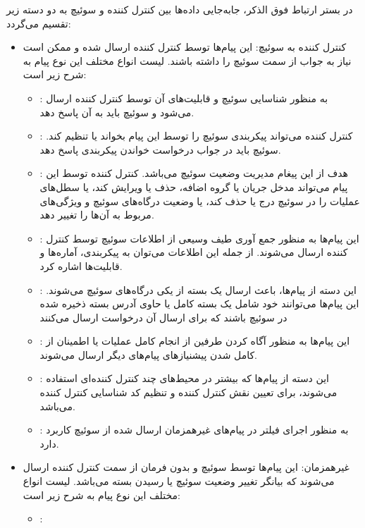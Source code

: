 در بستر ارتباط فوق الذکر، جا‌به‌جایی داده‌ها بین کنترل کننده و سوئیچ به دو دسته زیر تقسیم می‌گردد:
\begin{itemize}
	\item
	کنترل کننده به سوئیچ: این پیام‌ها توسط کنترل کننده ارسال شده و ممکن است نیاز به جواب از سمت سوئیچ را داشته باشند. لیست انواع مختلف این نوع پیام به شرح زیر است:
	\begin{itemize}
		\item {}:
		به منظور شناسایی سوئیچ و قابلیت‌های آن توسط کنترل‌ کننده ارسال می‌شود و سوئیچ باید به آن پاسخ دهد.
		\item {}:
		کنترل کننده می‌تواند پیکربندی سوئیچ را توسط این پیام بخواند یا تنظیم کند. سوئیچ باید در جواب درخواست خواندن پیکربندی پاسخ دهد.
		\item {}:
		هدف از این پیغام مدیریت وضعیت سوئیچ می‌باشد. کنترل کننده توسط این پیام می‌تواند مدخل جریان یا گروه اضافه، حذف یا ویرایش کند، یا سطل‌های عملیات را در سوئیچ درج یا حذف کند، یا وضعیت درگاه‌های سوئیچ و ویژگی‌های مربوط به آن‌ها را تغییر دهد.
		\item {}:
		این پیام‌ها به منظور جمع آوری طیف وسیعی از اطلاعات سوئیچ توسط کنترل کننده ارسال می‌شوند. از جمله این اطلاعات می‌توان به پیکربندی، آماره‌ها و قابلیت‌ها اشاره کرد.
		\item {}:
		این دسته از پیام‌ها، باعث ارسال یک بسته از یکی درگاه‌های سوئیچ می‌شوند. این پیام‌ها می‌توانند خود شامل یک بسته کامل یا حاوی آدرس بسته ذخیره شده در سوئیچ باشند که برای ارسال آن درخواست ارسال می‌کنند
		\item {}:
		این پیام‌ها به منظور آگاه کردن طرفین از انجام کامل عملیات یا اطمینان از کامل شدن پیشنیاز‌های پیام‌های دیگر ارسال می‌شوند.
		\item {}:
		این دسته از پیام‌ها که بیشتر در محیط‌‌های چند کنترل کننده‌ای استفاده می‌شوند، برای تعیین نقش کنترل کننده و تنظیم کد شناسایی کنترل کننده می‌باشد.
		\item {}:
		به منظور اجرای فیلتر در پیام‌های غیرهمزمان ارسال شده از سوئیچ کاربرد دارد.
	\end{itemize}
	\item
	غیر‌همزمان: این پیام‌ها توسط سوئیچ و بدون فرمان از سمت کنترل کننده ارسال می‌شوند که بیانگر تغییر وضعیت سوئیچ یا رسیدن بسته می‌باشد. لیست انواع مختلف این نوع پیام به شرح زیر است:
	\begin{itemize}
		\item {}:

\end{itemize}
\end{itemize}
